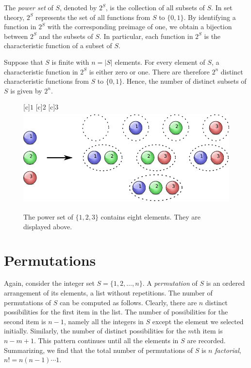 \begin{example}
The \emph{power set} of $S$, denoted by $2^S$, is the collection of all subsets of $S$. 
In set theory, $2^S$ represents the set of all functions from $S$ to $\{ 0, 1\}$.
By identifying a function in $2^S$ with the corresponding preimage of one, we obtain a bijection between $2^S$ and the subsets of $S$.
In particular, each function in $2^S$ is the characteristic function of a subset of $S$.

Suppose that $S$ is finite with $n = |S|$ elements.
For every element of $S$, a characteristic function in $2^S$ is either zero or one.
There are therefore $2^n$ distinct characteristic functions from $S$ to $\{ 0, 1\}$.
Hence, the number of distinct subsets of $S$ is given by $2^n$.

\begin{figure}[htb!]
\begin{center}
\begin{psfrags}
[c]{$1$}
[c]{$2$}
[c]{$3$}
\includegraphics[height=4.965cm]{Figures/4Chapter/powerset}
\end{psfrags}
\caption{The power set of $\{ 1, 2, 3 \}$ contains eight elements.
They are displayed above.}
\label{figure:PowerSet}
\end{center}
\end{figure}
\end{example}


\section{Permutations}

Again, consider the integer set $S = \{ 1, 2, \ldots, n \}$.
A \emph{permutation} of $S$ is an ordered arrangement of its elements, a list without repetitions. 
The number of permutations of $S$ can be computed as follows.
Clearly, there are $n$ distinct possibilities for the first item in the list.
The number of possibilities for the second item is $n-1$, namely all the integers in $S$ except the element we selected initially.
Similarly, the number of distinct possibilities for the $m$th item is $n - m + 1$.
This pattern continues until all the elements in $S$ are recorded.
Summarizing, we find that the total number of permutations of $S$ is $n$ \emph{factorial}, $n! = n (n-1) \cdots 1$. 


